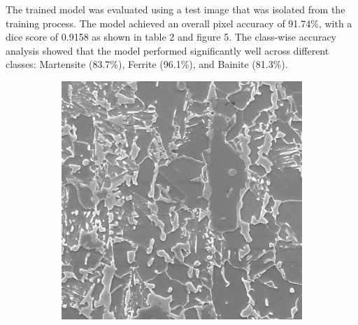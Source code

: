 \documentclass[]{article}
\begin{document}
The trained model was evaluated using a test image that was isolated from the training process. The model achieved an overall pixel accuracy of 91.74\%, with a dice score of 0.9158 as shown in table 2 and figure 5. The class-wise accuracy analysis showed that the model performed significantly well across different classes: Martensite (83.7\%), Ferrite (96.1\%), and Bainite (81.3\%). 


\begin{figure}[ht]
	\centering
	
	\begin{subfigure}[b]{0.3\textwidth}
		\centering
		\includegraphics[width=\textwidth]{images/inference/SameSteelSameMag-O.jpg}
		\caption{}
		\label{fig:samesteelsamemag-orig}
	\end{subfigure}
	\hfill
	\begin{subfigure}[b]{0.3\textwidth}
		\centering

\end{subfigure}
\end{figure}
\end{document}
